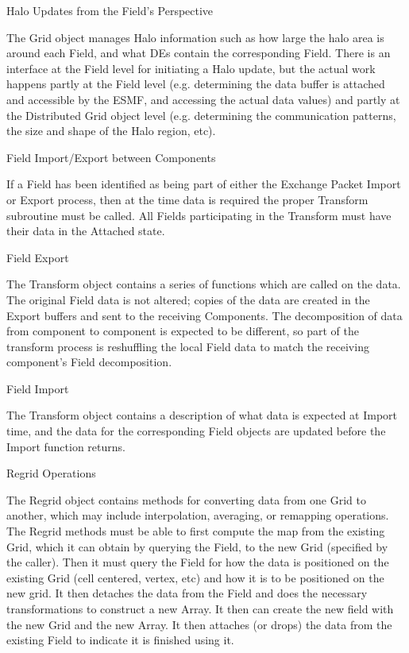 \begin{description}

\item{Halo Updates from the Field's Perspective}

The Grid object manages Halo information such as how large the
halo area is around each Field, and what DEs contain the
corresponding Field.  There is an interface at the Field level
for initiating a Halo update, but the actual work happens
partly at the Field level (e.g. determining the data buffer is
attached and accessible by the ESMF, and accessing
the actual data values) and partly at the Distributed Grid
object level (e.g. determining the communication patterns, the
size and shape of the Halo region, etc).

\item{Field Import/Export between Components}

If a Field has been identified as being part of either the
Exchange Packet Import or Export process, then at the time
data is required the proper Transform subroutine must be 
called.  All Fields participating in the Transform must have
their data in the Attached state.  

\item{Field Export}

The Transform object contains
a series of functions which are called on the data.  The
original Field data is not altered; copies of the data are
created in the Export buffers and sent to the receiving
Components.  The decomposition of data from component to
component is expected to be different, so part of the transform
process is reshuffling the local Field data to match the
receiving component's Field decomposition.

\item{Field Import}

The Transform object contains a description of what data is
expected at Import time, and the data for the corresponding
Field objects are updated before the Import function returns.

\item{Regrid Operations}

The Regrid object contains methods for converting data from
one Grid to another, which may include interpolation, averaging,
or remapping operations.  The Regrid methods must be able to
first compute the map from the existing Grid, which it can
obtain by querying the Field, to the new Grid (specified by
the caller).  Then it must query the Field for how the data
is positioned on the existing Grid (cell centered, vertex, etc)
and how it is to be positioned on the new grid.  It then detaches
the data from the Field and does the necessary transformations
to construct a new Array.  It then can create the new field
with the new Grid and the new Array.  It then attaches
(or drops) the data from the existing Field to indicate it is
finished using it.


\end{description}
